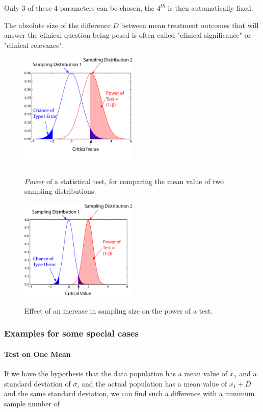 Only 3 of these 4 parameters can be chosen, the $4^{th}$ is then automatically fixed.

The absolute size of the difference $D$ between mean treatment outcomes that will answer the clinical question being posed is often called "clinical significance" or "clinical relevance".

\begin{figure}[!ht]
  \centering
  \includegraphics[width=0.5\textwidth]{../Images/power1.png}\\
  \caption{\emph{Power} of a statistical test, for comparing the mean value of two sampling distributions.}\label{fig:power1}
\end{figure}

\begin{figure}[!ht]
  \centering
  \includegraphics[width=0.5\textwidth]{../Images/power2.png}\\
  \caption{Effect of an increase in sampling size on the power of a test.}\label{fig:power2}
\end{figure}

\subsubsection{Examples for some special cases}

\paragraph{Test on One Mean}
If we have the hypothesis that the data population has a mean value of $x_1$ and a standard deviation of $\sigma$, and the actual population has a mean value of $x_1+D$ and the same standard deviation, we can find such a difference with a minimum sample number of

